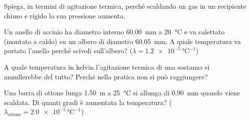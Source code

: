 \begin{esercizio}
Spiega, in termini di agitazione termica, perché scaldando un gas in un recipiente chiuso e rigido la sua pressione aumenta.\\
\end{esercizio}

\begin{esercizio}
Un anello di acciaio ha diametro interno \SI{60,00}{\milli\metre} a \SI{20}{\celsius} e va calettato (montato a caldo) su un albero di diametro \SI{60,05}{\milli\metre}. A quale temperatura va portato l'anello perché scivoli sull'albero? ($\lambda = \num{1,2e-5}\,\si{\celsius}^{-1}$)\\
\end{esercizio}

\begin{esercizio}
A quale temperatura in kelvin l'agitazione termica di una sostanza si annullerebbe del tutto? Perché nella pratica non si può raggiungere?\\
\end{esercizio}

\begin{esercizio}
Una barra di ottone lunga \SI{1,50}{\metre} a \SI{25}{\celsius} si allunga di \SI{0,90}{\milli\metre} quando viene scaldata. Di quanti gradi è aumentata la temperatura? ($\lambda_{\text{ottone}} = \num{2,0e-5}\,\si{\celsius}^{-1}$)\\
\end{esercizio}
